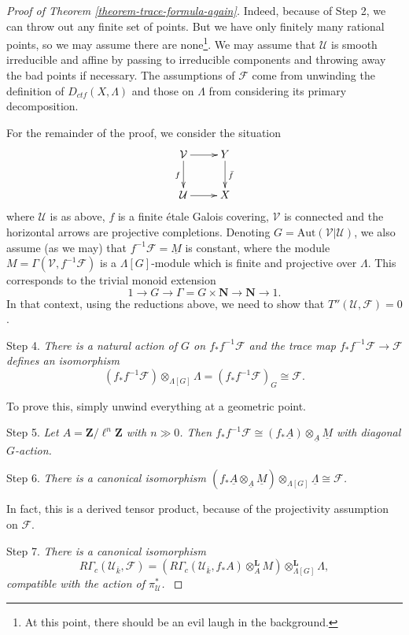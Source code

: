 \documentclass{stacks-project}
\theoremstyle{plain}
\theoremstyle{definition}
\theoremstyle{remark}
\numberwithin{equation}{subsection}
\begin{document}
\begin{proof}[Proof of Theorem \ref{theorem-trace-formula-again}]
\medskip\noindent
Indeed, because of Step 2, we can throw out any finite set of points. But we
have only finitely many rational points, so we may assume there are
none\footnote{At this point, there should be an evil laugh in the background.}.
We may assume that $\mathcal{U}$ is smooth irreducible and affine by passing to
irreducible components and throwing away the bad points if necessary. The
assumptions of $\mathcal{F}$ come from unwinding the definition of
$D_{ctf}(X, \Lambda)$ and those on $\Lambda$ from considering its primary
decomposition.

\medskip\noindent
For the remainder of the proof, we consider the situation
$$
\xymatrix{
\mathcal{V} \ar[d]_f \ar[r] & Y \ar[d]^{\bar f} \\
\mathcal{U} \ar[r] & X
}
$$
where $\mathcal{U}$ is as above, $f$ is a finite \'etale Galois covering,
$\mathcal{V}$ is connected and the horizontal arrows are projective
completions. Denoting $G=\text{Aut}(\mathcal{V}|\mathcal{U})$, we also assume
(as we may) that $f^{-1}\mathcal{F} =\underline M$ is constant, where the
module $M = \Gamma(\mathcal{V}, f^{-1}\mathcal{F})$ is a $\Lambda[G]$-module
which is finite and projective over $\Lambda$. This corresponds to the trivial
monoid extension
$$
1\to G\to \Gamma = G \times \mathbf{N}\to \mathbf{N}\to 1.
$$
In that context, using the reductions above, we need to show that
$T''(\mathcal{U}, \mathcal{F}) = 0$.

\medskip\noindent
Step 4. {\it There is a natural action of $G$ on $f_*f^{-1}\mathcal{F}$ and
the trace map $f_*f^{-1}\mathcal{F}\to \mathcal{F}$ defines an isomorphism}
$$
(f_*f^{-1}\mathcal{F})\otimes_{\Lambda[G]} \Lambda =
(f_*f^{-1}\mathcal{F})_G \cong \mathcal{F}.
$$

\medskip\noindent
To prove this, simply unwind everything at a geometric point.

\medskip\noindent
Step 5. {\it Let $A = \mathbf{Z}/\ell^n \mathbf{Z}$ with $n\gg 0$. Then
$f_*f^{-1}\mathcal{F} \cong (f_*\underline A)
\otimes_{\underline A} \underline M$ with diagonal $G$-action.}

\medskip\noindent
Step 6. {\it There is a canonical isomorphism
$(f_*\underline A \otimes_{\underline A} \underline M)
\otimes_{\Lambda[G]} \underline \Lambda \cong \mathcal{F}$.
}

\medskip\noindent
In fact, this is a derived tensor product, because of the projectivity
assumption on $\mathcal{F}$.

\medskip\noindent
Step 7. {\it There is a canonical isomorphism
$$
R\Gamma_c(\mathcal{U}_{\bar k}, \mathcal{F})
= (R\Gamma_c(\mathcal{U}_{\bar k}, f_*A)\otimes_A^\mathbf{L}
M)\otimes_{\Lambda[G]}^\mathbf{L} \Lambda,
$$
compatible with the action of $\pi^*_\mathcal{U}$.
}


\end{proof}
\end{document}
